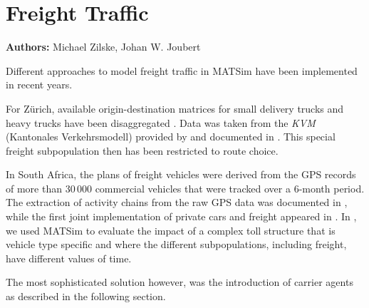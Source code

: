 \chapter{Freight Traffic}
\label{ch:freight}

\hfill \textbf{Authors:} Michael Zilske, Johan W. Joubert



Different approaches to model freight traffic in MATSim have been implemented in recent years. 

For Zürich, available origin-destination matrices for small delivery trucks and heavy trucks have been disaggregated \citet[][]{ShahM_TechRep_IVT_2010}. Data was taken from the \emph{KVM} (Kantonales Verkehrsmodell) provided by \citet{AMV_Webpage_2011} and documented in \citet[][]{GottardiBuergler_SV_1999}. This special freight subpopulation then has been restricted to route choice.

In South Africa, the plans of freight vehicles were derived from the GPS records of more than 30\,000 commercial vehicles that were tracked over a 6-month period. The extraction of activity chains from the raw GPS data was documented in \citet[][]{JoubertAxhausen_JTG_2011}, while the first joint implementation of private cars and freight appeared in \citet[][]{JoubertJEtAl_TRR_2010}. In \citet[][]{NagelKickhoeferJoubert2014HeterogeneousVoTsPROCEDIA}, we used MATSim to evaluate the impact of a complex toll structure that is vehicle type specific and where the different subpopulations, including freight, have different values of time.

The most sophisticated solution however, was the introduction of carrier agents as described in the following section. 

